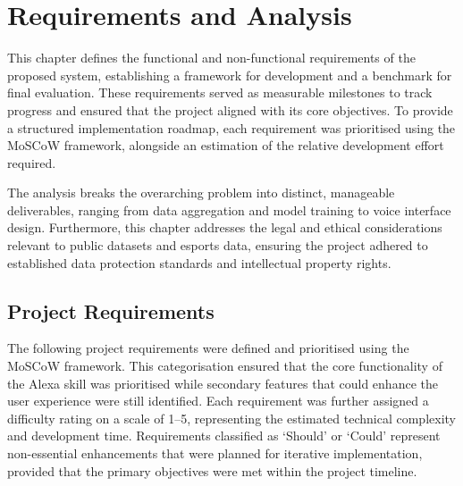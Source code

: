 \chapter{Requirements and Analysis}
\label{chap:req_analysis}
This chapter defines the functional and non-functional requirements of the proposed system, establishing a framework for development and a benchmark for final evaluation. These requirements served as measurable milestones to track progress and ensured that the project aligned with its core objectives. To provide a structured implementation roadmap, each requirement was prioritised using the MoSCoW framework, alongside an estimation of the relative development effort required.

The analysis breaks the overarching problem into distinct, manageable deliverables, ranging from data aggregation and model training to voice interface design. Furthermore, this chapter addresses the legal and ethical considerations relevant to public datasets and esports data, ensuring the project adhered to established data protection standards and intellectual property rights.

\section{Project Requirements}
The following project requirements were defined and prioritised using the MoSCoW framework. This categorisation ensured that the core functionality of the Alexa skill was prioritised while secondary features that could enhance the user experience were still identified. Each requirement was further assigned a difficulty rating on a scale of 1--5, representing the estimated technical complexity and development time. Requirements classified as `Should' or `Could' represent non-essential enhancements that were planned for iterative implementation, provided that the primary objectives were met within the project timeline.

